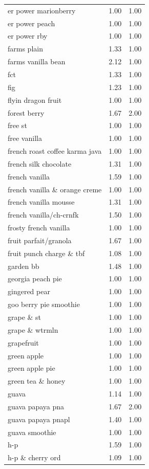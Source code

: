\begin{table}
\begin{tabular}{lrr}
er power marionberry & 1.00 & 1.00 \\
er power peach & 1.00 & 1.00 \\
er power rby & 1.00 & 1.00 \\
farms plain & 1.33 & 1.00 \\
farms vanilla bean & 2.12 & 1.00 \\
fct & 1.33 & 1.00 \\
fig & 1.23 & 1.00 \\
flyin dragon fruit & 1.00 & 1.00 \\
forest berry & 1.67 & 2.00 \\
free st & 1.00 & 1.00 \\
free vanilla & 1.00 & 1.00 \\
french roast coffee karma java & 1.00 & 1.00 \\
french silk chocolate & 1.31 & 1.00 \\
french vanilla & 1.59 & 1.00 \\
french vanilla \& orange creme & 1.00 & 1.00 \\
french vanilla mousse & 1.31 & 1.00 \\
french vanilla/ch-crnfk & 1.50 & 1.00 \\
frosty french vanilla & 1.00 & 1.00 \\
fruit parfait/granola & 1.67 & 1.00 \\
fruit punch charge \& tbf & 1.08 & 1.00 \\
garden bb & 1.48 & 1.00 \\
georgia peach pie & 1.00 & 1.00 \\
gingered pear & 1.00 & 1.00 \\
goo berry pie smoothie & 1.00 & 1.00 \\
grape \& st & 1.00 & 1.00 \\
grape \& wtrmln & 1.00 & 1.00 \\
grapefruit & 1.00 & 1.00 \\
green apple & 1.00 & 1.00 \\
green apple pie & 1.00 & 1.00 \\
green tea \& honey & 1.00 & 1.00 \\
guava & 1.14 & 1.00 \\
guava papaya pna & 1.67 & 2.00 \\
guava papaya pnapl & 1.40 & 1.00 \\
guava smoothie & 1.00 & 1.00 \\
h-p & 1.59 & 1.00 \\
h-p \& cherry ord & 1.09 & 1.00 \\

\end{tabular}
\end{table}
